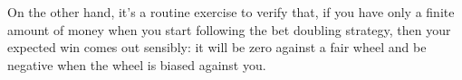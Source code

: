 On the other hand, it's a routine exercise \iffalse
(Problem~\ref{PS_st_petersburg_bounded})\fi to verify that, if you
have only a finite amount of money when you start following the bet
doubling strategy, then your expected win comes out sensibly: it will
be zero against a fair wheel and be negative when the wheel is biased
against you.

\begin{problems}
\practiceproblems
{}

\classproblems
{}

\examproblems
{}
\end{problems}

\endinput


